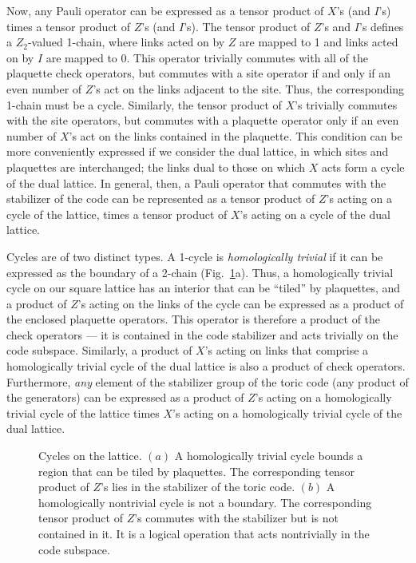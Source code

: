 Now, any Pauli operator can be expressed as a tensor product of $X$'s (and $I$'s) times a tensor product of $Z$'s (and $I$'s).  The tensor product of $Z$'s and $I$'s defines a $Z_2$-valued 1-chain, where links acted on by $Z$ are mapped to 1 and links acted on by $I$ are mapped to 0. This operator trivially commutes with all of the plaquette check operators, but commutes with a site operator if and only if an even number of $Z$'s act on the links adjacent to the site.  Thus, the corresponding 1-chain must be a cycle. Similarly, the tensor product of $X$'s trivially commutes with the site operators, but commutes with a plaquette operator only if an even number of $X$'s act on the links contained in the plaquette. This condition can be more conveniently expressed if we consider the dual lattice, in which sites and plaquettes are interchanged; the links dual to those on which $X$ acts form a cycle of the dual lattice.  In general, then, a Pauli operator that commutes with the stabilizer of the code can be represented as a tensor product of $Z$'s acting on a cycle of the lattice, times a tensor product of $X$'s acting on a cycle of the dual lattice.

Cycles are of two distinct types.  A 1-cycle is {\em homologically trivial} if it can be expressed as the boundary of a 2-chain (Fig.~\ref{fig_homo}a).  Thus, a homologically trivial cycle on our square lattice has an interior that can be ``tiled'' by plaquettes, and a product of $Z$'s acting on the links of the cycle can be expressed as a product of the enclosed plaquette operators.  This operator is therefore a product of the check operators --- it is contained in the code stabilizer and acts trivially on the code subspace. Similarly, a product of $X$'s acting on links that comprise a homologically trivial cycle of the dual lattice is also a product of check operators. Furthermore, {\em any} element of the stabilizer group of the toric code (any product of the generators) can be expressed as a product of $Z$'s acting on a homologically trivial cycle of the lattice times $X$'s acting on a homologically trivial cycle of the dual lattice.

\begin{figure}
\begin{center}
\leavevmode
\epsfxsize=3in
\end{center}
\caption{Cycles on the lattice. $(a)$ A homologically trivial cycle bounds a region that can be tiled by plaquettes. The corresponding tensor product of $Z$'s lies in the stabilizer of the toric code. $(b)$ A homologically nontrivial cycle is not a boundary. The corresponding tensor product of $Z$'s commutes with the stabilizer but is not contained in it. It is a logical operation that acts nontrivially in the code subspace.}
\label{fig_homo}
\end{figure}

